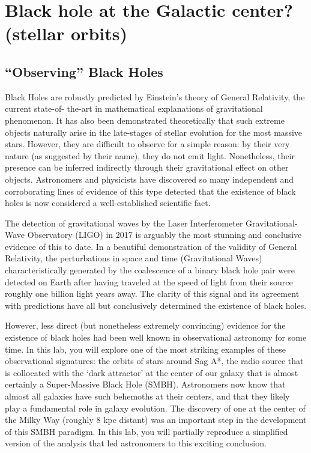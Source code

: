\chapter{Black hole at the Galactic center? (stellar orbits)}

\section{``Observing'' Black Holes}

Black Holes are robustly predicted by Einstein's theory of General Relativity, the current state-of-
the-art in mathematical explanations of gravitational phenomenon. It has also been demonstrated
theoretically that such extreme objects naturally arise in the late-stages of stellar evolution for the
most massive stars. However, they are difficult to observe for a simple reason: by their very nature (as
suggested by their name), they do not emit light. Nonetheless, their presence can be inferred indirectly
through their gravitational effect on other objects. Astronomers and physicists have discovered so many
independent and corroborating lines of evidence of this type detected that the existence of black holes
is now considered a well-established scientific fact.

The detection of gravitational waves by the Laser Interferometer Gravitational-Wave Observatory
(LIGO) in 2017 is arguably the most stunning and conclusive evidence of this to date. In a
beautiful demonstration of the validity of General Relativity, the perturbations in space and time
(Gravitational Waves) characteristically generated by the coalescence of a binary black hole pair were
detected on Earth after having traveled at the speed of light from their source roughly one billion light
years away. The clarity of this signal and its agreement with predictions have all but conclusively
determined the existence of black holes.

However, less direct (but nonetheless extremely convincing) evidence for the existence of black holes
had been well known in observational astronomy for some time. In this lab, you will explore one of the
most striking examples of these observational signatures: the orbits of stars around Sag A*, the radio source that is collocated with the `dark attractor' at the center of our galaxy that is almost certainly a Super-Massive Black Hole (SMBH). Astronomers now know that almost all galaxies have such behemoths at their centers, and that they likely play a fundamental role in galaxy evolution. The discovery of one at the center of the Milky Way (roughly 8 kpc distant) was an important step in the development of this SMBH paradigm. In this lab, you will partially reproduce a simplified version of the analysis that led astronomers to this exciting conclusion.

